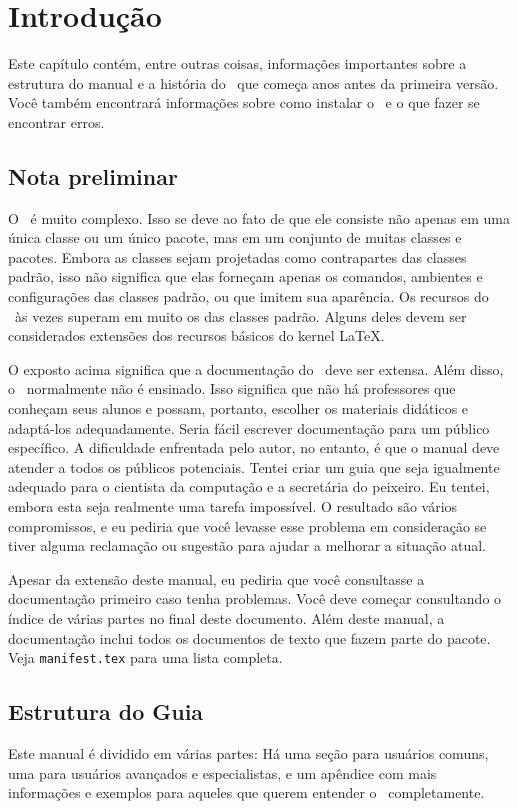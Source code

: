 \chapter{Introdução}
Este capítulo contém, entre outras coisas, informações importantes sobre a estrutura do manual e a história do \KOMAScript\, que começa anos antes da primeira versão. Você também encontrará informações sobre como instalar o \KOMAScript\ e o que fazer se encontrar erros.

\section{Nota preliminar}
O \KOMAScript\ é muito complexo. Isso se deve ao fato de que ele consiste não apenas em uma única classe ou um único pacote, mas em um conjunto de muitas classes e pacotes. Embora as classes sejam projetadas como contrapartes das classes padrão, isso não significa que elas forneçam apenas os comandos, ambientes e configurações das classes padrão, ou que imitem sua aparência. Os recursos do \KOMAScript\ às vezes superam em muito os das classes padrão. Alguns deles devem ser considerados extensões dos recursos básicos do kernel \LaTeX.

O exposto acima significa que a documentação do \KOMAScript\ deve ser extensa. Além disso, o \KOMAScript\ normalmente não é ensinado. Isso significa que não há professores que conheçam seus alunos e possam, portanto, escolher os materiais didáticos e adaptá-los adequadamente. Seria fácil escrever documentação para um público específico. A dificuldade enfrentada pelo autor, no entanto, é que o manual deve atender a todos os públicos potenciais. Tentei criar um guia que seja igualmente adequado para o cientista da computação e a secretária do peixeiro. Eu tentei, embora esta seja realmente uma tarefa impossível. O resultado são vários compromissos, e eu pediria que você levasse esse problema em consideração se tiver alguma reclamação ou sugestão para ajudar a melhorar a situação atual.

Apesar da extensão deste manual, eu pediria que você consultasse a documentação primeiro caso tenha problemas. Você deve começar consultando o índice de várias partes no final deste documento. Além deste manual, a documentação inclui todos os documentos de texto que fazem parte do pacote. Veja \texttt{manifest.tex} para uma lista completa.
\section{Estrutura do Guia}
Este manual é dividido em várias partes: Há uma seção para usuários comuns, uma para usuários avançados e especialistas, e um apêndice com mais informações e exemplos para aqueles que querem entender o \KOMAScript\ completamente.

